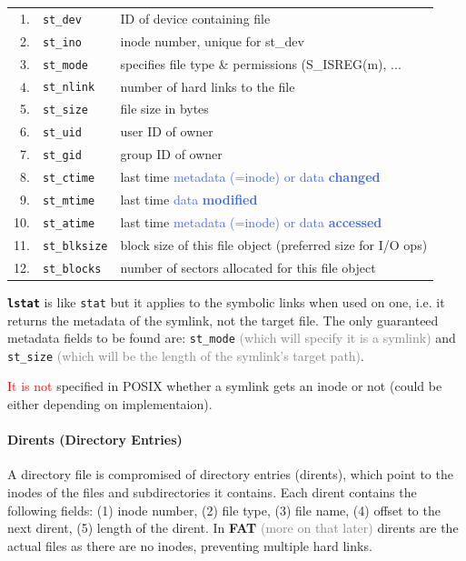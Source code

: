 \documentclass[openany,12pt]{book}
\newcommand{\code}[1]{\texttt{#1}}
\newcommand{\red}[1]{\textcolor{Red}{#1}}
\newcommand{\blue}[1]{\textcolor{RoyalBlue}{#1}}
\newcommand{\gray}[1]{\textcolor{gray}{#1}}
\begin{document}
\begin{tabular}{r l l}
1. & \texttt{st\_dev} & ID of device containing file \\
2. & \texttt{st\_ino} & inode number, unique for st\_dev \\
3. & \texttt{st\_mode} & specifies file type \& permissions (S\_ISREG(m), ... \\
4. & \texttt{st\_nlink} & number of hard links to the file \\
5. & \texttt{st\_size} & file size in bytes \\
6. & \texttt{st\_uid} & user ID of owner \\
7. & \texttt{st\_gid} & group ID of owner \\
8. & \texttt{st\_ctime} & last time \blue{metadata (=inode) or data \textbf{changed}} \\
9. & \texttt{st\_mtime} & last time \blue{data \textbf{modified}}  \\
10. & \texttt{st\_atime} & last time \blue{metadata (=inode) or data \textbf{accessed}} \\
11. & \texttt{st\_blksize} & block size of this file object (preferred size for I/O ops) \\
12. & \texttt{st\_blocks} & number of sectors allocated for this file object \\
\end{tabular}

\textbf{\code{lstat}} is like \code{stat} but it applies to the symbolic links when used on one, i.e. it returns the metadata of the symlink, not the target file. The only guaranteed metadata fields to be found are: \code{st\_mode} \gray{(which will specify it is a symlink)} and \code{st\_size} \gray{(which will be the length of the symlink's target path)}.

\red{It is not} specified in POSIX whether a symlink gets an inode or not (could be either
 depending on implementaion).


\paragraph{Dirents (Directory Entries)} A directory file is compromised of directory entries (dirents), which point to the inodes of the files and subdirectories it contains. Each dirent contains the following fields: (1) inode number, (2) file type, (3) file name, (4) offset to the next dirent, (5) length of the dirent. In \textbf{FAT} \gray{(more on that later)} dirents are the actual files as there are no inodes, preventing multiple hard links.
\end{document}
